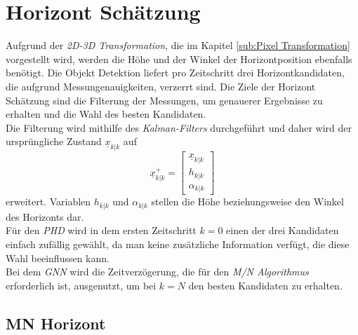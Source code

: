 \documentclass[10pt,a4paper]{article}
\begin{document}
\section{Horizont Schätzung}
Aufgrund der \textit{2D-3D Transformation}, die im Kapitel \ref{sub:Pixel Transformation} vorgestellt wird, werden die Höhe und der Winkel der Horizontposition ebenfalls benötigt. Die Objekt Detektion liefert pro Zeitschritt drei Horizontkandidaten, die aufgrund Messungenauigkeiten, verzerrt sind. Die Ziele der Horizont Schätzung sind die Filterung der Messungen, um genauerer Ergebnisse zu erhalten und die Wahl des besten Kandidaten.\\
Die Filterung wird mithilfe des \textit{Kalman-Filters} durchgeführt und daher wird der ursprüngliche Zustand $\underline{x}_{k|k}$ auf 
\begin{equation}
\underline{x}^+_{k|k} = \begin{bmatrix}
\underline{x}_{k|k} \\
h_{k|k}\\
\alpha_{k|k}
\end{bmatrix}
\end{equation}
erweitert. Variablen $h_{k|k}$ und $\alpha_{k|k}$ stellen die Höhe beziehungsweise den Winkel des Horizonts dar.\\
Für den \textit{PHD} wird in dem ersten Zeitschritt $k = 0$ einen der drei Kandidaten einfach zufällig gewählt, da man keine zusätzliche Information verfügt, die diese Wahl beeinflussen kann.\\
Bei dem \textit{GNN} wird die Zeitverzögerung, die für den \textit{M/N Algorithmus} erforderlich ist, ausgenutzt, um bei $k = N$ den besten Kandidaten zu erhalten.
\subsection{MN Horizont}
\end{document}
